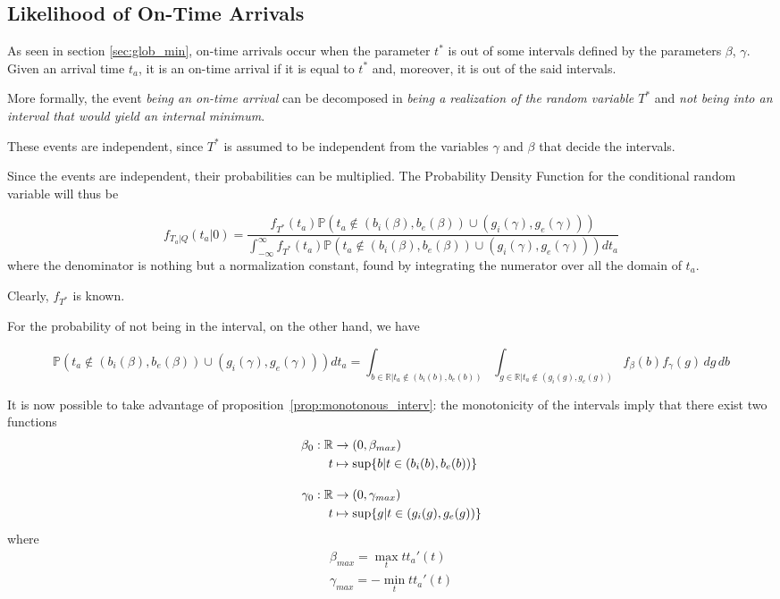 \subsection{Likelihood of On-Time Arrivals}
\label{sec:lik_ot}

As seen in section \ref{sec:glob_min},
on-time arrivals occur when the parameter \(t^*\) is out of some intervals defined by the parameters \(\beta\), \(\gamma\).
Given an arrival time \(t_a\),
it is an on-time arrival if it is equal to \(t^*\) and, moreover, it is out of the said intervals.

More formally, the event \textit{being an on-time arrival} can be decomposed in \textit{being a realization of the random variable \(T^*\)} and \textit{not being into an interval that would yield an internal minimum}.

These events are independent, since \(T^*\) is assumed to be independent from the variables \(\gamma\) and \(\beta\) that decide the intervals.

Since the events are independent, their probabilities can be multiplied.
The Probability Density Function for the conditional random variable will thus be

\begin{equation}
  \label{eq:pdf_ot}
    f_{T_a | Q}(t_a | 0) = \frac{f_{T^*}(t_a)\mathbb{P}( t_a \not\in (b_i(\beta), b_e(\beta)) \cup (g_i(\gamma), g_e(\gamma)))}{\int_{-\infty}^\infty f_{T^*}(t_a)\mathbb{P}( t_a \not\in (b_i(\beta), b_e(\beta)) \cup (g_i(\gamma), g_e(\gamma)))dt_a}
\end{equation}
where the denominator is nothing but a normalization constant, found by integrating the numerator over all the domain of \(t_a\).

Clearly, \(f_{T^*}\) is known.

For the probability of not being in the interval, on the other hand, we have 

\begin{equation}
  \label{eq:prob_not_interv}
  \mathbb{P}( t_a \not\in (b_i(\beta), b_e(\beta)) \cup (g_i(\gamma), g_e(\gamma)))dt_a = \int_{b\in \mathbb{R} \vert t_a \not\in (b_i(b), b_e(b))}\int_{g \in \mathbb{R} \vert t_a \not\in (g_i(g), g_e(g))}f_\beta(b)f_\gamma(g)\, dg\, db
\end{equation}

It is now possible to take advantage of proposition~\ref{prop:monotonous_interv}:
the monotonicity of the intervals imply that there exist two functions
\begin{equation}
  \label{eq:def_b_0_g_0}
  \begin{split}
    \beta_0:\mathbb{R}&\rightarrow(0, \beta_{max}) \\
    t&\mapsto \sup\{b | t \in (b_i(b), b_e(b))\} \\[1em]
    \gamma_0:\mathbb{R}&\rightarrow(0, \gamma_{max}) \\
    t&\mapsto \sup\{g | t \in (g_i(g), g_e(g))\}
  \end{split}
\end{equation}
where
\begin{align*}
  \beta_{max} = \max_t tt_a'(t) \\
  \gamma_{max} = -\min_t tt_a'(t)
\end{align*}

